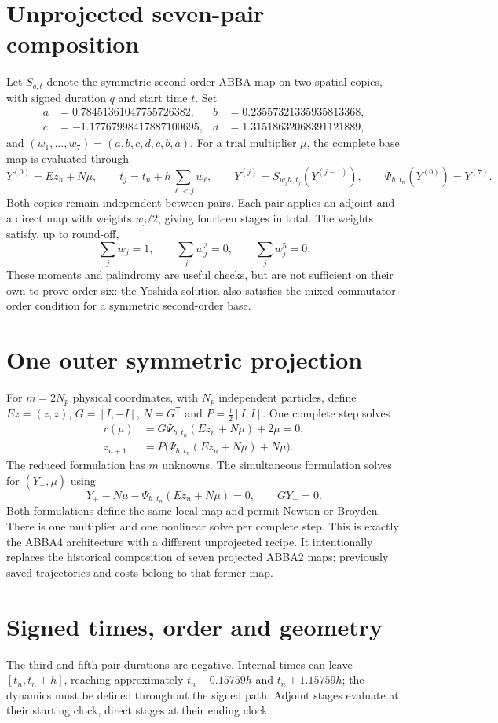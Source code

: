 \documentclass[11pt,a4paper]{article}
\begin{document}
\section{Unprojected seven-pair composition}
Let $S_{q,t}$ denote the symmetric second-order ABBA map on two spatial
copies, with signed duration $q$ and start time $t$. Set
\begin{align*}
a&=0.78451361047755726382,&b&=0.23557321335935813368,\\
c&=-1.17767998417887100695,&d&=1.31518632068391121889,
\end{align*}
and $(w_1,\ldots,w_7)=(a,b,c,d,c,b,a)$. For a trial multiplier $\mu$,
the complete base map is evaluated through
\[
 Y^{(0)}=Ez_n+N\mu,\qquad
 t_j=t_n+h\sum_{\ell<j}w_\ell,\qquad
 Y^{(j)}=S_{w_jh,t_j}(Y^{(j-1)}),\qquad
 \Psi_{h,t_n}(Y^{(0)})=Y^{(7)}.
\]
Both copies remain independent between pairs. Each pair applies an adjoint
and a direct map with weights $w_j/2$, giving fourteen stages in total.
The weights satisfy, up to round-off,
\[
 \sum_jw_j=1,\qquad \sum_jw_j^3=0,\qquad \sum_jw_j^5=0.
\]
These moments and palindromy are useful checks, but are not sufficient on
their own to prove order six: the Yoshida solution also satisfies the mixed
commutator order condition for a symmetric second-order base.

\section{One outer symmetric projection}
For $m=2N_p$ physical coordinates, with $N_p$ independent particles, define
$Ez=(z,z)$, $G=[I,-I]$, $N=G^{\mathsf T}$ and $P=\tfrac12[I,I]$.
One complete step solves
\begin{align*}
 r(\mu)&=G\Psi_{h,t_n}(Ez_n+N\mu)+2\mu=0,\\
 z_{n+1}&=P\bigl(\Psi_{h,t_n}(Ez_n+N\mu)+N\mu\bigr).
\end{align*}
The reduced formulation has $m$ unknowns. The simultaneous formulation
solves for $(Y_+,\mu)$ using
\[
 Y_+-N\mu-\Psi_{h,t_n}(Ez_n+N\mu)=0,\qquad GY_+=0.
\]
Both formulations define the same local map and permit Newton or Broyden.
There is one multiplier and one nonlinear solve per complete step. This is
exactly the ABBA4 architecture with a different unprojected recipe. It
intentionally replaces the historical composition of seven projected ABBA2
maps; previously saved trajectories and costs belong to that former map.

\section{Signed times, order and geometry}
The third and fifth pair durations are negative. Internal times can leave
$[t_n,t_n+h]$, reaching approximately $t_n-0.15759h$ and $t_n+1.15759h$;
the dynamics must be defined throughout the signed path. Adjoint stages
evaluate at their starting clock, direct stages at their ending clock.
\end{document}
